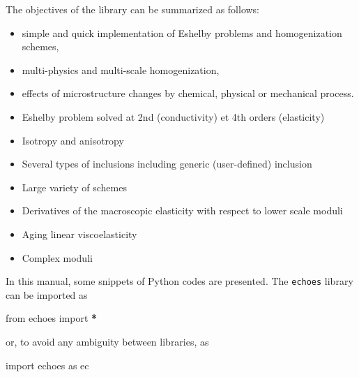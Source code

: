 \documentclass[
  a4paper,
  numbers=noendperiod,
  DIV=12]{scrreprt}
\newenvironment{Shaded}{\begin{snugshade}}{\end{snugshade}}
\newcommand{\ImportTok}[1]{#1}
\newcommand{\NormalTok}[1]{#1}
\newcommand{\OperatorTok}[1]{\textcolor[rgb]{0.81,0.36,0.00}{\textbf{#1}}}
\begin{document}
The objectives of the library can be summarized as follows:

\begin{itemize}
\item
  simple and quick implementation of Eshelby problems and homogenization
  schemes,
\item
  multi-physics and multi-scale homogenization,
\item
  effects of microstructure changes by chemical, physical or mechanical
  process.
\end{itemize}

\begin{tcolorbox}[enhanced jigsaw, title={Features}, left=2mm, titlerule=0mm, colback=white, breakable, colframe=quarto-callout-note-color-frame, bottomtitle=1mm, toptitle=1mm, rightrule=.15mm, bottomrule=.15mm, coltitle=black, opacitybacktitle=0.6, arc=.35mm, colbacktitle=quarto-callout-note-color!10!white, leftrule=.75mm, opacityback=0, toprule=.15mm]

\begin{itemize}
\item
  Eshelby problem solved at 2nd (conductivity) et 4th orders
  (elasticity)
\item
  Isotropy and anisotropy
\item
  Several types of inclusions including generic (user-defined) inclusion
\item
  Large variety of schemes
\item
  Derivatives of the macroscopic elasticity with respect to lower scale
  moduli
\item
  Aging linear viscoelasticity
\item
  Complex moduli
\end{itemize}

\end{tcolorbox}

In this manual, some snippets of Python codes are presented. The
\texttt{echoes} library can be imported as

\begin{Shaded}
\begin{Highlighting}[]
\ImportTok{from}\NormalTok{ echoes }\ImportTok{import} \OperatorTok{*}
\end{Highlighting}
\end{Shaded}

or, to avoid any ambiguity between libraries, as

\begin{Shaded}
\begin{Highlighting}[]
\ImportTok{import}\NormalTok{ echoes }\ImportTok{as}\NormalTok{ ec}
\end{Highlighting}
\end{Shaded}
\end{document}
